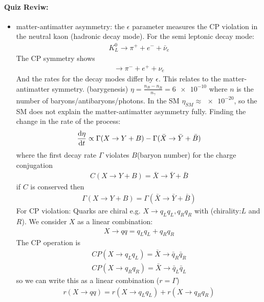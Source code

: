 \documentclass[../main.tex]{subfiles}
\begin{document}
\paragraph*{Quiz Reviw:}
\begin{itemize}
    \item matter-antimatter asymmetry: the $\epsilon$ parameter measures the CP violation in the
    neutral kaon (hadronic decay mode). For the semi leptonic decay mode:
    \begin{align*}
        K_L^0 \to \pi^+ + e^- + \bar \nu_e
    \end{align*}
    The CP symmetry shows
    \begin{align*}
        \to \pi^- + e^+ + \nu_e
    \end{align*}
    And the rates for the decay modes differ by $\epsilon$. This relates to the matter-antimatter
    symmetry. (barygenesis) $\eta = \frac{n_B - n_{\bar B}}{n_\gamma} = \num{6e-10}$ where $n$ is
    the number of baryons/antibaryons/photons. In the SM $\eta_{SM} \approx \num{e-20}$, so the 
    SM does not explain the matter-antimatter asymmetry fully. Finding the change in the rate of the
    process:
    \begin{align*}
        \dv{\eta}{t} \propto \Gamma(X \to Y + B) - \Gamma(\bar X \to \bar Y + \bar B)
    \end{align*}
    where the first decay rate $\Gamma$ violates $B$(baryon number) for the charge conjugation
    \begin{align*}
        C(X \to Y + B) = \bar X \to \bar Y + \bar B
    \end{align*}
    if $C$ is conserved then
    \begin{align*}
        \Gamma(X \to Y + B) = \Gamma(\bar X \to \bar Y + \bar B)
    \end{align*}
    For CP violation: Quarks are chiral e.g. $X \to q_L q_L, q_R q_R$ with (chirality:$L$ and $R$).
    We consider $X$ as a linear combination:
    \begin{align*}
        X \to q q = q_L q_L + q_R q_R
    \end{align*}
    The CP operation is
    \begin{align*}
        CP(X \to q_L q_L) = \bar X \to \bar q_R \bar q_R \\
        CP(X \to q_R q_R) = \bar X \to \bar q_L \bar q_L 
    \end{align*}
    so we can write this as a linear combination ($r = \Gamma$)
    \begin{align*}
        r(X \to q q) = r(X \to q_L q_L) + r(X \to q_R q_R) \\

\end{align*}
\end{itemize}
\end{document}
